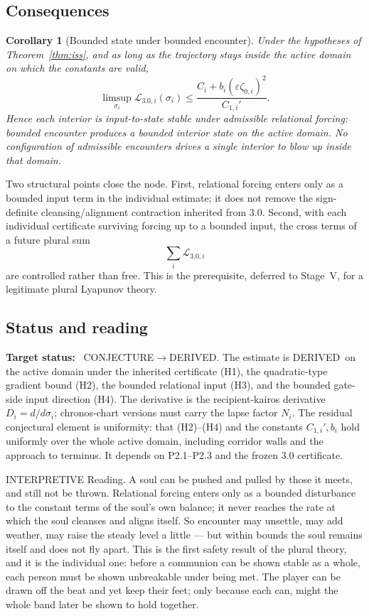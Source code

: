 \documentclass[11pt,a4paper]{article}
\def\emph#1{#1}%
\newcommand{\stDerived}{\textcolor{cDer}{\textsf{\small DERIVED}}}
\newcommand{\stInterp}{\textcolor{cInt}{\textsf{\small INTERPRETIVE}}}
\newcommand{\stConj}{\textcolor{cCon}{\textsf{\small CONJECTURE}}}
\theoremstyle{definition}
\theoremstyle{plain}
\newtheorem{corollary}[definition]{Corollary}
\theoremstyle{remark}
\begin{document}
\subsection{Consequences}

\begin{corollary}[Bounded state under bounded encounter]\label{cor:bddstate}
Under the hypotheses of Theorem~\ref{thm:iss}, and as long as the trajectory stays
inside the active domain on which the constants are valid,
\[
\limsup_{\sigma_i}
\mathcal L_{3.0,i}(\sigma_i)
\le
\frac{
C_i+b_i(\varepsilon\zeta_{0,i})^2
}{
C_{1,i}'
}.
\]
Hence each interior is input-to-state stable under admissible relational forcing:
bounded encounter produces a bounded interior state on the active domain. No
configuration of admissible encounters drives a single interior to blow up inside
that domain.
\end{corollary}

Two structural points close the node. First, relational forcing enters only as a
bounded input term in the individual estimate; it does not remove the
sign-definite cleansing/alignment contraction inherited from 3.0. Second, with
each individual certificate surviving forcing up to a bounded input, the cross
terms of a future plural sum
\[
\sum_i\mathcal L_{3.0,i}
\]
are controlled rather than free. This is the prerequisite, deferred to Stage~V, for
a legitimate plural Lyapunov theory.

\subsection{Status and reading}

\textbf{Target status:}~
\stConj\(\to\)\stDerived. The estimate is \stDerived\ on the active domain under
the inherited certificate (H1), the quadratic-type gradient bound (H2), the bounded
relational input (H3), and the bounded gate-side input direction (H4). The
derivative is the recipient-kairos derivative \(D_i=d/d\sigma_i\); chronos-chart
versions must carry the lapse factor \(N_i\). The residual conjectural element is
uniformity: that (H2)--(H4) and the constants \(C_{1,i}',b_i\) hold uniformly over
the whole active domain, including corridor walls and the approach to terminus.
It depends on P2.1--P2.3 and the frozen 3.0 certificate.

\medskip
\stInterp\quad
\emph{Reading.}
A soul can be pushed and pulled by those it meets, and still not be thrown. Relational
forcing enters only as a bounded disturbance to the constant terms of the soul's own
balance; it never reaches the rate at which the soul cleanses and aligns itself. So
encounter may unsettle, may add weather, may raise the steady level a little --- but within
bounds the soul remains itself and does not fly apart. This is the first safety result of
the plural theory, and it is the individual one: before a communion can be shown stable as a
whole, each person must be shown unbreakable under being met. The player can be drawn off the
beat and yet keep their feet; only because each can, might the whole band later be shown to
hold together.
\end{document}
